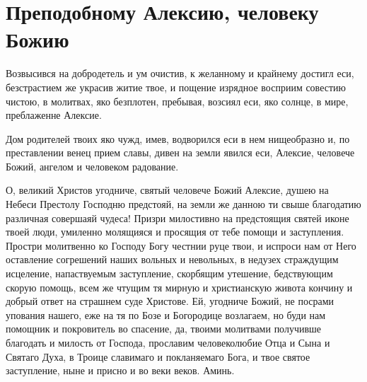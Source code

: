 \mychapterending


 

\section{Преподобному Алексию, человеку Божию}\begin{mymulticols}
 


Возвысився на добродетель и ум очистив, к желанному и крайнему достигл еси, безстрастием же украсив житие твое, и пощение изрядное восприим совестию чистою, в молитвах, яко безплотен, пребывая, возсиял еси, яко солнце, в мире, преблаженне Алексие.


Дом родителей твоих яко чужд, имев, водворился еси в нем нищеобразно и, по преставлении венец прием славы, дивен на земли явился еси, Алексие, человече Божий, ангелом и человеком радование.


О, великий Христов угодниче, святый человече Божий Алексие, душею на Небеси Престолу Господню предстояй, на земли же данною ти свыше благодатию различная совершаяй чудеса! Призри милостивно на предстоящия святей иконе твоей люди, умиленно молящияся и просящия от тебе помощи и заступления. Простри молитвенно ко Господу Богу честнии руце твои, и испроси нам от Него оставление согрешений наших вольных и невольных, в недузех страждущим исцеление, напаствуемым заступление, скорбящим утешение, бедствующим скорую помощь, всем же чтущим тя мирную и христианскую живота кончину и добрый ответ на страшнем суде Христове. Ей, угодниче Божий, не посрами упования нашего, еже на тя по Бозе и Богородице возлагаем, но буди нам помощник и покровитель во спасение, да, твоими молитвами получивше благодать и милость от Господа, прославим человеколюбие Отца и Сына и Святаго Духа, в Троице славимаго и покланяемаго Бога, и твое святое заступление, ныне и присно и во веки веков. Аминь.

\end{mymulticols}

\mychapterending


